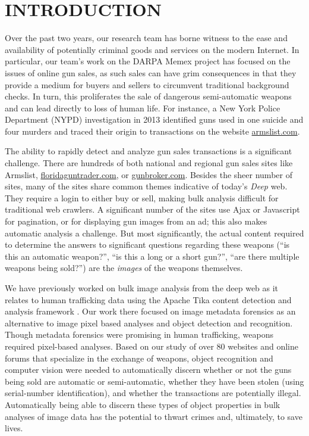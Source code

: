 \section{INTRODUCTION}

Over the past two years, our research team has borne witness to the ease and availability of potentially criminal goods and services on the modern Internet. In particular, our team's work on the DARPA Memex project has focused on the issues of online gun sales, as such sales can have grim consequences in that they provide a medium for buyers and sellers to circumvent traditional background checks. In turn, this proliferates the sale of dangerous semi-automatic weapons and can lead directly to loss of human life. For instance, a New York Police Department (NYPD) investigation in 2013 identified guns used in one suicide and four murders and traced their origin to transactions on the website \url{armslist.com}\cite{raja_2016}. 

The ability to rapidly detect and analyze gun sales transactions is a significant challenge. There are hundreds of both national and regional gun sales sites like Armslist, \url{floridaguntrader.com}, or \url{gunbroker.com}. Besides the sheer number of sites, many of the sites share common themes indicative of today's {\em Deep} web. They require a login to either buy or sell, making bulk analysis difficult for traditional web crawlers. A significant number of the sites use Ajax or Javascript for pagination, or for displaying gun images from an ad; this also makes automatic analysis a challenge. But most significantly, the actual content required to determine the answers to significant questions regarding these weapons (``is this an automatic weapon?'', ``is this a long or a short gun?'', ``are there multiple weapons being sold?'') are the {\em images} of the weapons themselves. 

We have previously worked on bulk image analysis from the deep web as it relates to human trafficking data \cite{mattmann7tg} using the Apache Tika content detection and analysis framework \cite{mattmann2011tika}. Our work there focused on image metadata forensics as an alternative to image pixel based analyses and object detection and recognition. Though metadata forensics were promising in human trafficking, weapons required pixel-based analyses. Based on our study of over 80 websites and online forums that specialize in the exchange of weapons, object recognition and computer vision were needed to automatically discern whether or not the guns being sold are automatic or semi-automatic, whether they have been stolen (using serial-number identification), and whether the transactions are potentially illegal. Automatically being able to discern these types of object properties in bulk analyses of image data has the potential to thwart crimes and, ultimately, to save lives.

